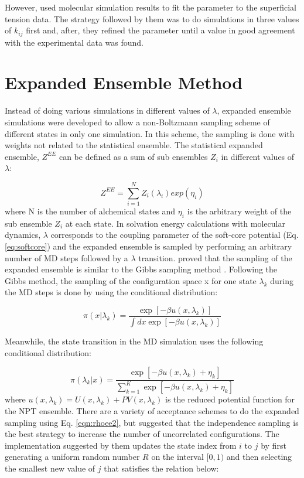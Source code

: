 However,  used molecular simulation results to fit the parameter to the superficial tension data. The strategy followed by them was to do simulations in three values of $k_{ij}$ first and, after, they refined the parameter until a value in good agreement with the experimental data was found. 


\section{Expanded Ensemble Method}\label{ee}
Instead of doing various simulations in different values of $\lambda$, expanded ensemble simulations \cite{lyubartsev} were developed to allow a non-Boltzmann sampling scheme of different states in only one simulation. In this scheme, the sampling is done with weights not related to the statistical ensemble. The statistical expanded ensemble, $Z^{EE}$ can be defined as a sum of sub ensembles $Z_{i}$ in different values of $\lambda$:

\begin{equation}
Z^{EE} = \sum_{i=1}^{N} Z_{i}(\lambda_{i}) exp(\eta_{i})
\label{eqn:ee}
\end{equation}   
where N is the number of alchemical states and $\eta_{i}$ is the arbitrary weight of the sub ensemble $Z_{i}$ at each state. In solvation energy calculations with molecular dynamics, $\lambda$ corresponds to the coupling parameter of the soft-core potential (Eq. \ref{eq:softcore}) and the expanded ensemble is sampled by performing an arbitrary number of MD  steps followed by a $\lambda$ transition.  proved that the sampling of the expanded ensemble is similar to the Gibbs sampling method \cite{geman1984,liu2002}. Following the Gibbs method, the sampling of the configuration space x for one state $\lambda_{k}$ during the MD steps is done by using the conditional distribution:

\begin{equation}
\pi(x|\lambda_{k}) = \dfrac{\exp[-\beta u(x,\lambda_{k})]}{\int dx \exp [- \beta u(x,\lambda_{k})]}
\label{eqn:rhoee1}
\end{equation} 

Meanwhile, the state transition in the MD simulation uses the following conditional distribution:

\begin{equation}
\pi(\lambda_{k}|x) = \dfrac{\exp[-\beta u(x,\lambda_{k}) + \eta_{k}]}{ \sum_{k=1}^{K} \exp [- \beta u(x,\lambda_{k})+ \eta_{k}]}
\label{eqn:rhoee2}
\end{equation} 
where $u(x,\lambda_{k}) = U(x,\lambda_{k}) + PV(x,\lambda_{k})$ is the reduced potential function for the NPT ensemble. There are a variety of acceptance schemes to do the expanded sampling using Eq. \eqref{eqn:rhoee2}, but  suggested that the independence sampling \cite{liu2002} is the best strategy to increase the number of uncorrelated configurations. The implementation suggested by them updates the state index from $i$ to $j$ by first generating a uniform random number $R$ on the interval $[0,1)$ and then selecting the smallest new value of $j$ that satisfies  the relation below:


